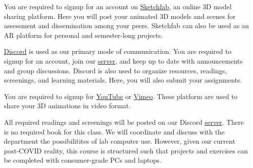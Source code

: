 You are required to signup for an account on \href{http://sketchfab.com}{Sketchfab}, an online 3D model sharing platform. Here you will post your animated 3D models and scenes for assessment and dissemination among your peers. Sketchfab can also be used as an AR platform for personal and semester-long projects.

\href{http://discordapp.com/}{Discord} is used as our primary mode of communication. You are required to signup for an account, join our \href{\discordURL}{server}, and keep up to date with announcements and group discussions. Discord is also used to organize resources, readings, screenings, and learning materials. Here, you will also submit your assignments.

You are required to signup for \href{https://www.youtube.com/}{YouTube} or \href{https://vimeo.com/}{Vimeo}. These platform are used to share your 3D animations in video format.

All required readings and screenings will be posted on our Discord \href{\discordURL}{server}. There is no required book for this class. We will coordinate and discuss with the department the possibilitites of lab computer use. However, given our current post-COVID reality, this course is structured such that projects and exercises can be completed with consumer-grade PCs and laptops.